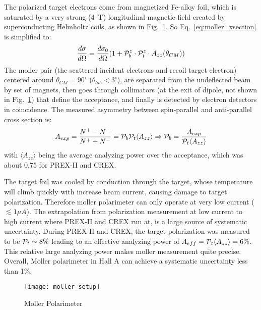 The polarized target electrons come from magnetized Fe-alloy foil, which is 
saturated by a very strong (4~T) longitudinal magnetic field created by 
superconducting Helmholtz coils, as shown in Fig.~\ref{fig:moller_polarimeter}. 
So Eq.~\ref{eq:moller_xsection} is simplified to:
\begin{equation}
    \frac{d\sigma}{d\Omega} = \frac{d\sigma_0}{d\Omega} ( 1 + \mathcal{P}_b^z \cdot \mathcal{P}_t^z \cdot A_{zz}(\theta_{CM}))
    \label{eq:moller_xsection_1}
\end{equation}
The moller pair (the scattered incident electrons and recoil target electron)
centered around $\theta_{CM} = 90^\circ$ ($\theta_{lab} < 3^\circ$), 
are separated from the undeflected beam by set of magnets, then goes through
collimators (at the exit of dipole, not shown in Fig.~\ref{fig:moller_polarimeter}) 
that define the acceptance, and finally is detected by electron detectors in coincidence.
The measured asymmetry between spin-parallel and anti-parallel cross section is:
\begin{equation}
    A_{exp} = \frac{N^+ - N^-}{N^+ + N^-} = \mathcal{P}_b \mathcal{P}_t \langle A_{zz} \rangle 
    \Rightarrow
    \mathcal{P}_b = \frac{A_{exp}}{\mathcal{P}_t \langle A_{zz} \rangle}
\end{equation}
with $\langle A_{zz} \rangle$ being the average analyzing power over the acceptance,
which was about 0.75 for PREX-II and CREX.

The target foil was cooled by conduction through the target, whose temperature 
will climb quickly with increase beam current, causing damage to target
polarization. Therefore moller polarimeter can only operate at very low current ($\lesssim 1\mu A$).
The extrapolation from polarization measurement at low current to high current
where PREX-II and CREX run at, is a large source of systematic uncertainty.
During PREX-II and CREX, the target polarization was measured to be $\mathcal{P}_t \sim 8\%$ 
leading to an effective analyzing power of $A_{eff} = \mathcal{P}_t\langle A_{zz} \rangle = 6\%$.
This relative large analyzing power makes moller measurement quite precise.
Overall, Moller polarimeter in Hall A can achieve a systematic uncertainty less
than 1\%.

\begin{figure}[h!]
    \centering
    \texttt{[image: moller\_setup]}
    \caption{Moller Polarimeter}
    \label{fig:moller_polarimeter}
\end{figure}

